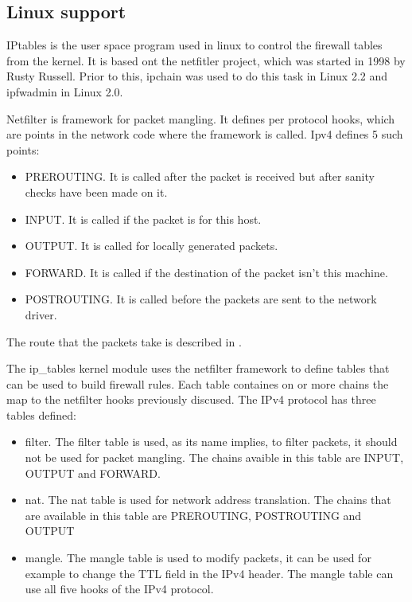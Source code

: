 \subsection{Linux support}
\label{sub-sec:firewall-lin}

IPtables is the user space program used in linux to control the firewall tables from the kernel. It is based
ont the netfitler project, which was started in 1998 by Rusty Russell. Prior to this, ipchain was used to do
this task in Linux 2.2 and ipfwadmin in Linux 2.0.

Netfilter is framework for packet mangling. It defines per protocol hooks, which are points in the network code
where the framework is called. Ipv4 defines 5 such points:
\begin{itemize}
  \item PREROUTING. It is called after the packet is received but after sanity checks have been made on it.
  \item INPUT. It is called if the packet is for this host.
  \item OUTPUT.	It is called for locally generated packets.
  \item FORWARD. It is called if the destination of the packet isn't this machine.
  \item POSTROUTING. It is called before the packets are sent to the network driver.
\end{itemize}
The route that the packets take is described in .

The ip_tables kernel module uses the netfilter framework to define tables that can be used to build firewall rules.
Each table containes on or more chains the map to the netfilter hooks previously discused. 
The IPv4 protocol has three tables defined:
\begin{itemize}
  \item filter. The filter table is used, as its name implies, to filter packets, it should not be used for packet mangling. The chains
avaible in this table are INPUT, OUTPUT and FORWARD.
  \item nat. The nat table is used for network address translation. The chains that are available in this table are PREROUTING,
 POSTROUTING and OUTPUT
  \item mangle. The mangle table is used to modify packets, it can be used for example to change the TTL field in
the IPv4 header. The mangle table can use all five hooks of the IPv4 protocol.
\end{itemize}

